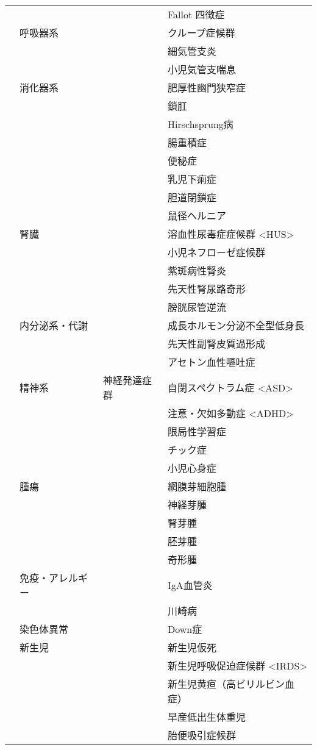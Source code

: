 \begin{xltabular}{\linewidth}{XXXX}
 &  &  & Fallot 四徴症 \\
 & 呼吸器系 &  & クループ症候群 \\
 &  &  & 細気管支炎 \\
 &  &  & 小児気管支喘息 \\
 & 消化器系 &  & 肥厚性幽門狭窄症 \\
 &  &  & 鎖肛 \\
 &  &  & Hirschsprung病 \\
 &  &  & 腸重積症 \\
 &  &  & 便秘症 \\
 &  &  & 乳児下痢症 \\
 &  &  & 胆道閉鎖症 \\
 &  &  & 鼠径ヘルニア \\
 & 腎臓 &  & 溶血性尿毒症症候群 <HUS> \\
 &  &  & 小児ネフローゼ症候群 \\
 &  &  & 紫斑病性腎炎 \\
 &  &  & 先天性腎尿路奇形 \\
 &  &  & 膀胱尿管逆流 \\
 & 内分泌系・代謝 &  & 成長ホルモン分泌不全型低身長 \\
 &  &  & 先天性副腎皮質過形成 \\
 &  &  & アセトン血性嘔吐症 \\
 & 精神系 & 神経発達症群 & 自閉スペクトラム症 <ASD> \\
 &  &  & 注意・欠如多動症 <ADHD> \\
 &  &  & 限局性学習症 \\
 &  &  & チック症 \\
 &  &  & 小児心身症 \\
 & 腫瘍 &  & 網膜芽細胞腫 \\
 &  &  & 神経芽腫 \\
 &  &  & 腎芽腫 \\
 &  &  & 胚芽腫 \\
 &  &  & 奇形腫 \\
 & 免疫・アレルギー &  & IgA血管炎 \\
 &  &  & 川崎病 \\
 & 染色体異常 &  & Down症 \\
 & 新生児 &  & 新生児仮死 \\
 &  &  & 新生児呼吸促迫症候群 <IRDS> \\
 &  &  & 新生児黄疸（高ビリルビン血症） \\
 &  &  & 早産低出生体重児 \\
 &  &  & 胎便吸引症候群 \\

\end{xltabular}
